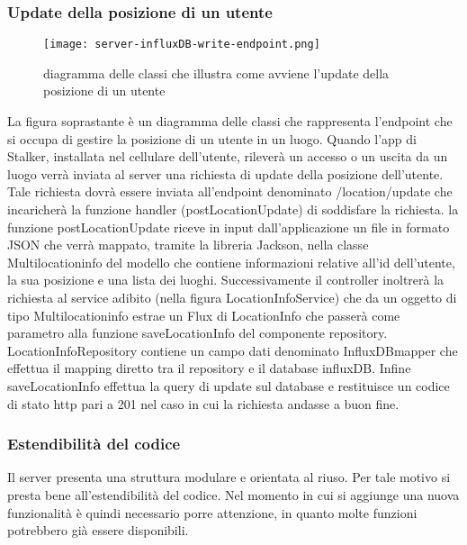 \documentclass[../../manuale-manutentore.tex]{subfiles}
\begin{document}
\subsubsection{Update della posizione di un utente}%
\label{subs:update_della_posizione_di_un_utente}

  \begin{figure}[H]
    \centering
    \texttt{[image: server-influxDB-write-endpoint.png]}
    \caption{diagramma delle classi che illustra come avviene l'update della posizione di un utente}%
     \label{fig:diagramma delle classi che illustra come avviene l'update della posizione di un}
  \end{figure}

  La figura soprastante è un diagramma delle classi che rappresenta l'endpoint che si occupa di gestire la posizione di un utente in un luogo.
  Quando l'app di Stalker, installata nel cellulare dell'utente, rileverà un accesso o un uscita da un luogo verrà inviata al server una richiesta di update della posizione dell'utente.
  Tale richiesta dovrà essere inviata all'endpoint denominato /location/update che incaricherà la funzione handler (postLocationUpdate) di soddisfare la richiesta.
  la funzione postLocationUpdate riceve in input dall'applicazione un file in formato JSON che verrà mappato, tramite la libreria Jackson, nella classe Multilocationinfo del modello che contiene informazioni relative all'id dell'utente, la sua posizione e una lista dei luoghi.
  Successivamente il controller inoltrerà la richiesta al service adibito (nella figura LocationInfoService) che da un oggetto di tipo Multilocationinfo estrae un Flux di LocationInfo che passerà come parametro alla funzione saveLocationInfo del componente repository.
  LocationInfoRepository contiene un campo dati denominato InfluxDBmapper che effettua il mapping diretto tra il repository e il database influxDB\@. Infine saveLocationInfo effettua la query di update sul database e restituisce un codice di stato http pari a 201 nel caso in cui la richiesta andasse a buon fine.

\subsubsection{Estendibilità del codice}%
\label{subs:estendibilita_del_codice}

Il server presenta una struttura modulare e orientata al riuso.
Per tale motivo si presta bene all'estendibilità del codice.
Nel momento in cui si aggiunge una nuova funzionalità è quindi necessario porre attenzione, in quanto molte funzioni potrebbero già essere disponibili.
\end{document}
